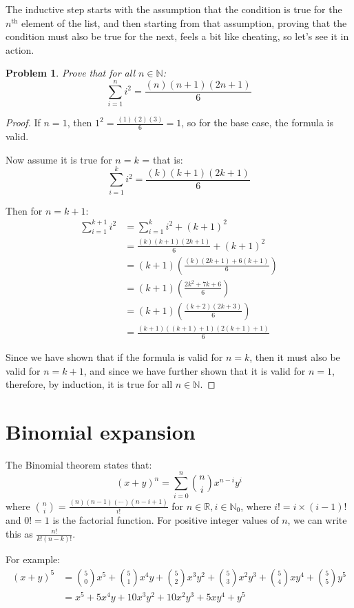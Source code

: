 \documentclass{article}
\newtheorem*{problem}{Problem}
\begin{document}
The inductive step starts with the assumption that the condition is true for the
$n^\text{th}$ element of the list, and then starting from that assumption, proving
that the condition must also be true for the next, feels a bit like cheating, so
let's see it in action.

\begin{problem} Prove that for all $n \in \mathbb{N}$:
	\[ \sum_{i=1}^{n} i^2 = \frac{(n)(n+1)(2n+1)}{6} \]
\end{problem}

\begin{proof}
	If $n = 1$, then $1^2 = \frac{(1)(2)(3)}{6} = 1$, so for the base case, the formula is valid.

	Now assume it is true for $n=k$ = that is:
	\[ \sum_{i=1}^{k} i^2 = \frac{(k)(k+1)(2k+1)}{6} \]

	Then for $n=k+1$:
	\begin{align*}
		\sum_{i=1}^{k+1} i^2 &= \sum_{i=1}^{k} i^2 + (k+1)^2 \\
		 &= \frac{(k)(k+1)(2k+1)}{6} + (k+1)^2 \\
		 &= \left(k+1\right)\left(\frac{(k)(2k+1) + 6(k+1)}{6}\right) \\
		 &= \left(k+1\right)\left(\frac{2k^2 +7k +6}{6}\right) \\
		 &= \left(k+1\right)\left(\frac{(k+2)(2k+3)}{6}\right) \\
		 &= \frac{(k+1)((k+1)+1)(2(k+1)+1)}{6}
	\end{align*}
	
	Since we have shown that if the formula is valid for $n=k$, then it must also
	be valid for $n=k+1$, and since we have further shown that it is valid for $n=1$,
	therefore, by induction, it is true for all $n \in \mathbb{N}$.
\end{proof}

\section{Binomial expansion}

The Binomial theorem states that:
\[ (x + y)^n = \sum_{i=0}^{n} \binom{n}{i}x^{n-i}y^{i} \]
where $\binom{n}{i} = \frac{(n)(n-1)(\cdots)(n-i+1)}{i!}$ for 
$n \in \mathbb{R}, i \in \mathbb{N}_0$, where $i! = i\times(i-1)!$ and $0!=1$ is the
factorial function. For positive integer values of $n$, we can write this as $\frac{n!}{k!(n-k)!}$.

For example:
\begin{align*}
	(x+y)^5 &= \binom{5}{0}x^5 + \binom{5}{1}x^4y + \binom{5}{2}x^3y^2 + 
	\binom{5}{3}x^2y^3 + \binom{5}{4}xy^4 + \binom{5}{5}y^5 \\
	 &= x^5 + 5x^4y + 10x^3y^2 + 10x^2y^3 + 5xy^4 + y^5
\end{align*}
\end{document}
